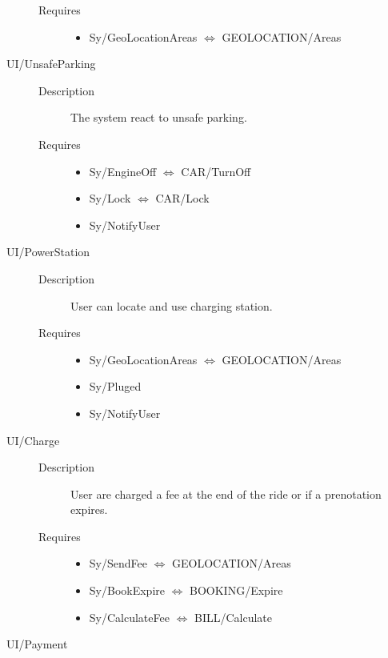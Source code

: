 \documentclass[11pt]{article} %
\begin{document}
\begin{description}
\begin{description}
		\item[Requires] \hfill
		\begin{itemize}
			\item Sy/GeoLocationAreas $\Leftrightarrow$ GEOLOCATION/Areas
		\end{itemize}
	\end{description}
	\item[UI/UnsafeParking] \hfill
	\begin{description}
		\item[Description] The system react to unsafe parking.
		\item[Requires] \hfill
		\begin{itemize}
			\item Sy/EngineOff $\Leftrightarrow$ CAR/TurnOff
			\item Sy/Lock $\Leftrightarrow$ CAR/Lock
			\item Sy/NotifyUser
		\end{itemize}
	\end{description}
	\item[UI/PowerStation] \hfill
	\begin{description}
		\item[Description] User can locate and use charging station.
		\item[Requires] \hfill
		\begin{itemize}
			\item Sy/GeoLocationAreas $\Leftrightarrow$ GEOLOCATION/Areas
			\item Sy/Pluged
			\item Sy/NotifyUser
		\end{itemize}
	\end{description}
	\item[UI/Charge] \hfill
	\begin{description}
		\item[Description] User are charged a fee at the end of the ride or if a prenotation expires.
		\item[Requires] \hfill
		\begin{itemize}
			\item Sy/SendFee $\Leftrightarrow$ GEOLOCATION/Areas
			\item Sy/BookExpire $\Leftrightarrow$ BOOKING/Expire
			\item Sy/CalculateFee $\Leftrightarrow$ BILL/Calculate
		\end{itemize}
	\end{description}
	\item[UI/Payment] \hfill

\end{description}
\end{document}
